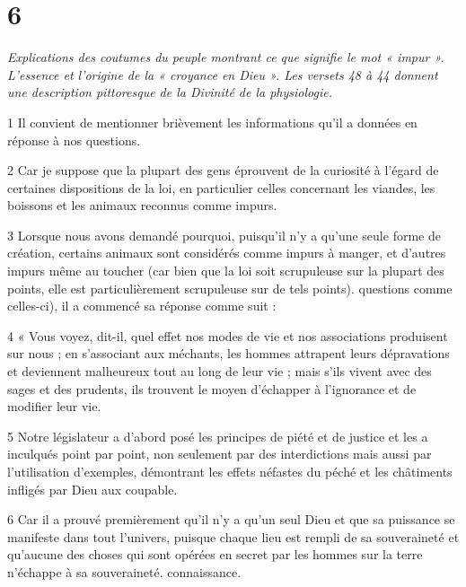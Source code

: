 \chapter{6}

\par \textit{Explications des coutumes du peuple montrant ce que signifie le mot « impur ». L’essence et l’origine de la « croyance en Dieu ». Les versets 48 à 44 donnent une description pittoresque de la Divinité de la physiologie.}

\par 1 Il convient de mentionner brièvement les informations qu'il a données en réponse à nos questions.

\par 2 Car je suppose que la plupart des gens éprouvent de la curiosité à l'égard de certaines dispositions de la loi, en particulier celles concernant les viandes, les boissons et les animaux reconnus comme impurs.

\par 3 Lorsque nous avons demandé pourquoi, puisqu'il n'y a qu'une seule forme de création, certains animaux sont considérés comme impurs à manger, et d'autres impurs même au toucher (car bien que la loi soit scrupuleuse sur la plupart des points, elle est particulièrement scrupuleuse sur de tels points). questions comme celles-ci), il a commencé sa réponse comme suit :

\par 4 « Vous voyez, dit-il, quel effet nos modes de vie et nos associations produisent sur nous ; en s'associant aux méchants, les hommes attrapent leurs dépravations et deviennent malheureux tout au long de leur vie ; mais s'ils vivent avec des sages et des prudents, ils trouvent le moyen d'échapper à l'ignorance et de modifier leur vie.

\par 5 Notre législateur a d'abord posé les principes de piété et de justice et les a inculqués point par point, non seulement par des interdictions mais aussi par l'utilisation d'exemples, démontrant les effets néfastes du péché et les châtiments infligés par Dieu aux coupable.

\par 6 Car il a prouvé premièrement qu'il n'y a qu'un seul Dieu et que sa puissance se manifeste dans tout l'univers, puisque chaque lieu est rempli de sa souveraineté et qu'aucune des choses qui sont opérées en secret par les hommes sur la terre n'échappe à sa souveraineté. connaissance.

